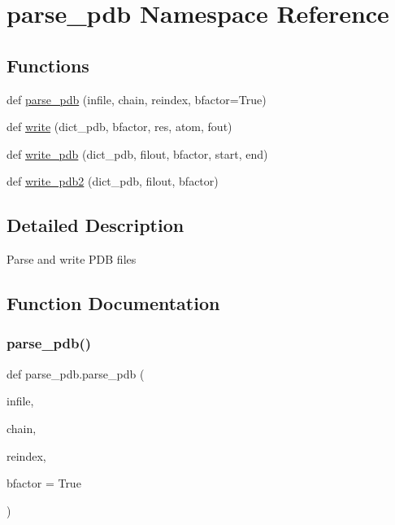 \hypertarget{namespaceparse__pdb}{}\section{parse\+\_\+pdb Namespace Reference}
\label{namespaceparse__pdb}
\subsection*{Functions}
\begin{DoxyCompactItemize}
\item 
def \hyperlink{namespaceparse__pdb_aa22ebfaad9469d4b4c032fd68a2e945c}{parse\+\_\+pdb} (infile, chain, reindex, bfactor=True)
\item 
def \hyperlink{namespaceparse__pdb_a21aa74876de3205653041f1e3c890510}{write} (dict\+\_\+pdb, bfactor, res, atom, fout)
\item 
def \hyperlink{namespaceparse__pdb_acab12153cf1cb7438173490b935d3ef8}{write\+\_\+pdb} (dict\+\_\+pdb, filout, bfactor, start, end)
\item 
def \hyperlink{namespaceparse__pdb_a11286d0c18b2f0468d7acf8db1ef028a}{write\+\_\+pdb2} (dict\+\_\+pdb, filout, bfactor)
\end{DoxyCompactItemize}


\subsection{Detailed Description}
\begin{DoxyVerb}Parse and write PDB files
\end{DoxyVerb}
 

\subsection{Function Documentation}
\mbox{\label{namespaceparse__pdb_aa22ebfaad9469d4b4c032fd68a2e945c}} 
\subsubsection{\texorpdfstring{parse\+\_\+pdb()}{parse\_pdb()}}
{\footnotesize\ttfamily def parse\+\_\+pdb.\+parse\+\_\+pdb (\begin{DoxyParamCaption}\item[{}]{infile,  }\item[{}]{chain,  }\item[{}]{reindex,  }\item[{}]{bfactor = {\ttfamily True} }\end{DoxyParamCaption})}

